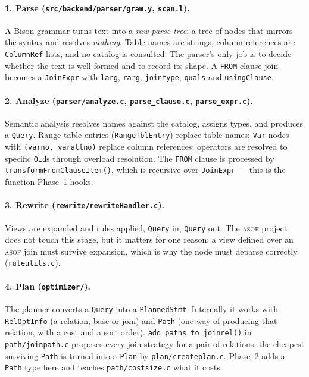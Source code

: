 \documentclass[11pt,a4paper]{report}
\theoremstyle{definition}
\theoremstyle{plain}
\newcommand{\code}[1]{\texttt{\small #1}}
\newcommand{\file}[1]{\texttt{\footnotesize #1}}
\newcommand{\asof}{{\normalfont\scshape asof}}
\begin{document}
\paragraph{1. Parse (\file{src/backend/parser/gram.y}, \file{scan.l}).}
A Bison grammar turns text into a \emph{raw parse tree}: a tree of nodes that mirrors the
syntax and resolves \emph{nothing}. Table names are strings, column references are
\code{ColumnRef} lists, and no catalog is consulted. The parser's only job is to decide
whether the text is well-formed and to record its shape. A \code{FROM} clause join becomes
a \code{JoinExpr} with \code{larg}, \code{rarg}, \code{jointype}, \code{quals} and
\code{usingClause}.

\paragraph{2. Analyze (\file{parser/analyze.c}, \file{parse\_clause.c}, \file{parse\_expr.c}).}
Semantic analysis resolves names against the catalog, assigns types, and produces a
\code{Query}. Range-table entries (\code{RangeTblEntry}) replace table names; \code{Var}
nodes with \code{(varno, varattno)} replace column references; operators are resolved to
specific \code{Oid}s through overload resolution. The \code{FROM} clause is processed by
\code{transformFromClauseItem()}, which is recursive over \code{JoinExpr} --- this is the
function Phase~1 hooks.

\paragraph{3. Rewrite (\file{rewrite/rewriteHandler.c}).}
Views are expanded and rules applied, \code{Query} in, \code{Query} out. The \asof{}
project does not touch this stage, but it matters for one reason: a view defined over an
\asof{} join must survive expansion, which is why the node must deparse correctly
(\file{ruleutils.c}).

\paragraph{4. Plan (\file{optimizer/}).}
The planner converts a \code{Query} into a \code{PlannedStmt}. Internally it works with
\code{RelOptInfo} (a relation, base or join) and \code{Path} (one way of producing that
relation, with a cost and a sort order). \code{add\_paths\_to\_joinrel()} in
\file{path/joinpath.c} proposes every join strategy for a pair of relations; the cheapest
surviving \code{Path} is turned into a \code{Plan} by \file{plan/createplan.c}. Phase~2
adds a \code{Path} type here and teaches \file{path/costsize.c} what it costs.
\end{document}

